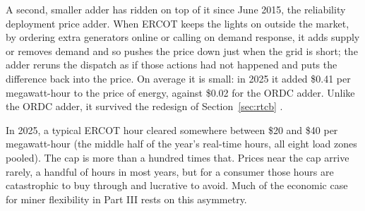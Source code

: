 A second, smaller adder has ridden on top of it since June 2015, the reliability deployment price adder. When ERCOT keeps the lights on outside the market, by ordering extra generators online or calling on demand response, it adds supply or removes demand and so pushes the price down just when the grid is short; the adder reruns the dispatch as if those actions had not happened and puts the difference back into the price. On average it is small: in 2025 it added \$0.41 per megawatt-hour to the price of energy, against \$0.02 for the ORDC adder. Unlike the ORDC adder, it survived the redesign of Section~\ref{sec:rtcb} \autocite{potomac2015som,potomac2026somercot}. %

In 2025, a typical ERCOT hour cleared somewhere between \$20 and \$40 per megawatt-hour (the middle half of the year's real-time hours, all eight load zones pooled). %
The cap is more than a hundred times that. Prices near the cap arrive rarely, a handful of hours in most years, but for a consumer those hours are catastrophic to buy through and lucrative to avoid. Much of the economic case for miner flexibility in Part III rests on this asymmetry.

